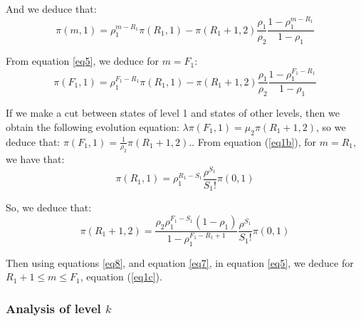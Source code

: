 \documentclass[conference]{IEEEtran}
\begin{document}
\noindent And we deduce that:
\begin{equation}
\pi(m,1)=\rho_1^{m-R_1} \pi(R_1,1)-\pi(R_1+1,2)\frac{\rho_1}{\rho_2}\frac{1-\rho_1^{m-R_1}}{1-\rho_1}  \label{eq5}
\end{equation}

\noindent From equation \ref{eq5}, we deduce for $m=F_1$:
\begin{equation}
\pi(F_1,1)=\rho_1^{F_1-R_1} \pi(R_1,1)-\pi(R_1+1,2)\frac{\rho_1}{\rho_2}\frac{1-\rho_1^{F_1-R_1}}{1-\rho_1} \label{eq6}
\end{equation}

\noindent If we make a cut between states of level 1 and states of other levels, then   we obtain the following evolution equation: $\lambda \pi(F_1,1) = \mu_2 \pi(R_1+1,2)$, so   we deduce that: 
$\pi(F_1,1)=\frac{1}{\rho_2} \pi(R_1+1,2).$.
\noindent From equation (\ref{eq1b}), for $m=R_1$, we have that:
\begin{equation}
\pi(R_1,1)=\rho_1^{R_1-S_1} \frac{\rho^{S_1}}{S_1!}\pi(0,1)
\label{eq8}
\end{equation}

\noindent So, we deduce that:
\begin{equation}
\pi(R_1+1,2)= \frac{\rho_2 \rho_1^{F_1-S_1} (1-\rho_1)} {1-\rho_1^{F_1-R_1+1}}  \frac{\rho^{S_1}}{S_1!}\pi(0,1)
\label{eq7}
\end{equation}



\noindent Then using equations \ref{eq8}, and equation \ref{eq7}, in equation \ref{eq5}, we deduce for $R_1+1 \leq m \leq  F_1$,  equation 
(\ref{eq1c}).




\subsubsection{Analysis of level $k$}
\end{document}
